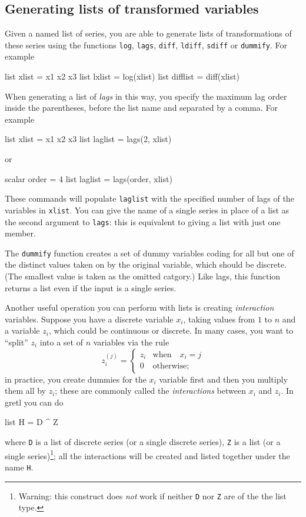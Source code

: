 \subsection{Generating lists of transformed variables}
\label{sec:transform-lists}

Given a named list of series, you are able to generate lists of
transformations of these series using the functions \texttt{log},
\texttt{lags}, \texttt{diff}, \texttt{ldiff}, \texttt{sdiff} or
\texttt{dummify}.  For example
%
\begin{code}
list xlist = x1 x2 x3
list lxlist = log(xlist)
list difflist = diff(xlist)
\end{code}

When generating a list of \textit{lags} in this way, you specify the
maximum lag order inside the parentheses, before the list name and
separated by a comma.  For example
%
\begin{code}
list xlist = x1 x2 x3
list laglist = lags(2, xlist)
\end{code}
%
or
%
\begin{code}
scalar order = 4
list laglist = lags(order, xlist)
\end{code}

These commands will populate \texttt{laglist} with the specified
number of lags of the variables in \texttt{xlist}.  You can give the
name of a single series in place of a list as the second argument to
\texttt{lags}: this is equivalent to giving a list with just one
member.

The \texttt{dummify} function creates a set of dummy variables coding
for all but one of the distinct values taken on by the original
variable, which should be discrete.  (The smallest value is taken as
the omitted catgory.)  Like lags, this function returns a list even if
the input is a single series.

Another useful operation you can perform with lists is creating
\emph{interaction} variables. Suppose you have a discrete variable
$x_i$, taking values from $1$ to $n$ and a variable $z_i$, which could
be continuous or discrete. In many cases, you want to ``split'' $z_i$
into a set of $n$ variables via the rule
\[
z^{(j)}_i =\left\{ 
    \begin{array}{ll}
      z_i & \mathrm{when} \quad x_i = j \\
      0 & \mathrm{otherwise;}
    \end{array}
    \right. 
\] 
in practice, you create dummies for the $x_i$ variable first and then
you multiply them all by $z_i$; these are commonly called the
\emph{interactions} between $x_i$ and $z_i$. In gretl you can do 
\begin{code}
  list H = D ^ Z
\end{code}
where \texttt{D} is a list of discrete series (or a single discrete
series), \texttt{Z} is a list (or a single series)\footnote{Warning:
  this construct does \emph{not} work if neither \texttt{D} nor
  \texttt{Z} are of the the list type.}; all the interactions will be
created and listed together under the name \texttt{H}.

